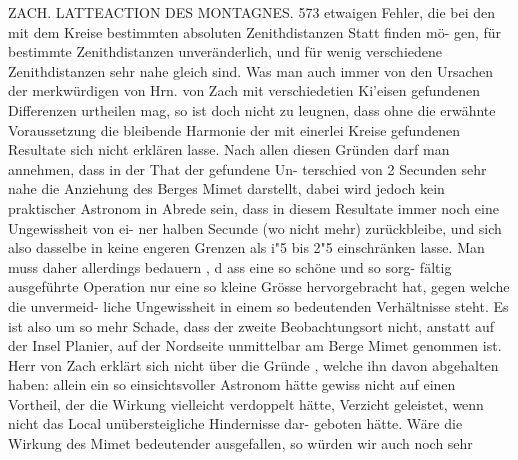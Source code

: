 \documentclass[12pt,a4paper]{article}
\begin{document}
\newpage
ZACH. LATTEACTION DES MONTAGNES. 573\newline
etwaigen Fehler, die bei den mit dem Kreise bestimmten absoluten Zenithdistanzen Statt finden mö-\newline
gen, für bestimmte Zenithdistanzen unveränderlich, und für wenig verschiedene Zenithdistanzen sehr\newline
nahe gleich sind. Was man auch immer von den Ursachen der merkwürdigen von Hrn. von Zach mit\newline
verschiedetien Ki'eisen gefundenen Differenzen urtheilen mag, so ist doch nicht zu leugnen, dass ohne die\newline
erwähnte Voraussetzung die bleibende Harmonie der mit einerlei Kreise gefundenen Resultate sich nicht\newline
erklären lasse. Nach allen diesen Gründen darf man annehmen, dass in der That der gefundene Un-\newline
terschied von 2 Secunden sehr nahe die Anziehung des Berges Mimet darstellt, dabei wird jedoch kein\newline
praktischer Astronom in Abrede sein, dass in diesem Resultate immer noch eine Ungewissheit von ei-\newline
ner halben Secunde (wo nicht mehr) zurückbleibe, und sich also dasselbe in keine engeren Grenzen als\newline
i"5 bis 2"5 einschränken lasse. Man muss daher allerdings bedauern , d ass eine so schöne und so sorg-\newline
fältig ausgeführte Operation nur eine so kleine Grösse hervorgebracht hat, gegen welche die unvermeid-\newline
liche Ungewissheit in einem so bedeutenden Verhältnisse steht. Es ist also um so mehr Schade, dass\newline
der zweite Beobachtungsort nicht, anstatt auf der Insel Planier, auf der Nordseite unmittelbar am Berge\newline
Mimet genommen ist. Herr von Zach erklärt sich nicht über die Gründe , welche ihn davon abgehalten\newline
haben: allein ein so einsichtsvoller Astronom hätte gewiss nicht auf einen Vortheil, der die Wirkung\newline
vielleicht verdoppelt hätte, Verzicht geleistet, wenn nicht das Local unübersteigliche Hindernisse dar-\newline
geboten hätte. Wäre die Wirkung des Mimet bedeutender ausgefallen, so würden wir auch noch sehr\newline
\end{document}
